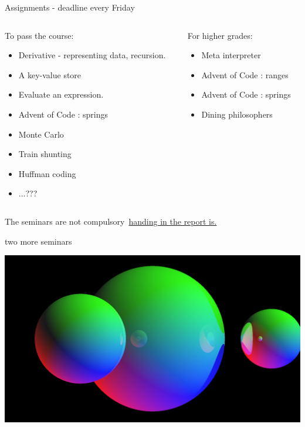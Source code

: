 \begin{frame}{Assignments - deadline every Friday}

\begin{columns}
 \begin{column}{0.6\linewidth}
   To pass the course:
   \begin{itemize}
   \item Derivative - representing data, recursion. 
   \item A key-value store
   \item Evaluate an expression. 

   \item Advent of Code : springs     
   \item Monte Carlo
   \item Train shunting 
   \item Huffman coding
   \item ...???
   \end{itemize}
 \end{column}
 \begin{column}{0.4\linewidth}

   \pause
   For higher grades:
   \begin{itemize}
   \item Meta interpreter
   \item Advent of Code : ranges
   \item Advent of Code : springs
   \item Dining philosophers
   \end{itemize}

 \end{column}
\end{columns}

\pause \vspace{20pt}
The seminars are not compulsory\pause\ \underline{handing in the report is.}

\end{frame}

\begin{frame}{two more seminars}

  \includegraphics[scale=0.2]{tracer.png}

\end{frame}



